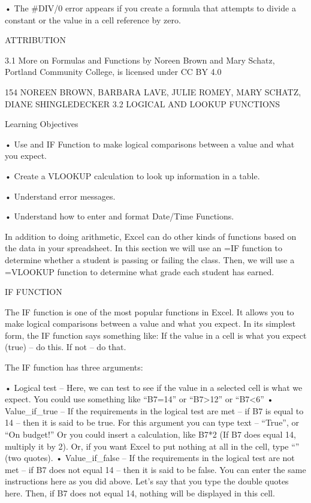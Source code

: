 • The #DIV/0 error appears if you create a formula that attempts to divide a constant or the value in a cell
reference by zero.



ATTRIBUTION

3.1 More on Formulas and Functions by Noreen Brown and Mary Schatz, Portland Community
College, is licensed under CC BY 4.0




154 NOREEN BROWN, BARBARA LAVE, JULIE ROMEY, MARY SCHATZ, DIANE SHINGLEDECKER
3.2 LOGICAL AND LOOKUP FUNCTIONS




Learning Objectives


• Use and IF Function to make logical comparisons between a value and what you expect.

• Create a VLOOKUP calculation to look up information in a table.

• Understand error messages.

• Understand how to enter and format Date/Time Functions.



In addition to doing arithmetic, Excel can do other kinds of functions based on the data in your
spreadsheet. In this section we will use an =IF function to determine whether a student is passing or
failing the class. Then, we will use a =VLOOKUP function to determine what grade each student has
earned.

IF FUNCTION

The IF function is one of the most popular functions in Excel. It allows you to make logical
comparisons between a value and what you expect. In its simplest form, the IF function says
something like:
If the value in a cell is what you expect (true) – do this. If not – do that.

The IF function has three arguments:

• Logical test – Here, we can test to see if the value in a selected cell is what we expect. You could
use something like “B7=14” or “B7>12” or “B7<6”
• Value_if_true – If the requirements in the logical test are met – if B7 is equal to 14 – then it is said
to be true. For this argument you can type text – “True”, or “On budget!” Or you could insert a
calculation, like B7*2 (If B7 does equal 14, multiply it by 2). Or, if you want Excel to put nothing at
all in the cell, type “” (two quotes).
• Value_if_false – If the requirements in the logical test are not met – if B7 does not equal 14 – then
it is said to be false. You can enter the same instructions here as you did above. Let’s say that you
type the double quotes here. Then, if B7 does not equal 14, nothing will be displayed in this cell.

